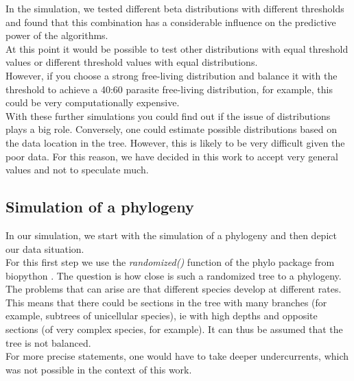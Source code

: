       In the simulation, we tested different beta distributions with different thresholds and found that 
        this combination has a considerable influence on the predictive power of the algorithms. \\
      At this point it would be possible to test other distributions with equal threshold values or 
        different threshold values with equal distributions. \\
      However, if you choose a strong free-living distribution and balance it with the threshold to 
        achieve a 40:60 parasite free-living distribution, for example, this could be very 
        computationally expensive. \\
      
      With these further simulations you could find out if the issue of distributions plays a big role. 
        Conversely, one could estimate possible distributions based on the data location in the tree. 
        However, this is likely to be very difficult given the poor data. For this reason, we have 
        decided in this work to accept very general values and not to speculate much. \\

    \subsection{Simulation of a phylogeny} \label{sec:discussion - simulate phylogeny}
      In our simulation, we start with the simulation of a phylogeny and then depict our data situation. \\
      For this first step we use the \textit{randomized()} function of the phylo package from biopython
        \cite{Cock2009}. The question is how close is such a randomized tree to a phylogeny. \\
      
      The problems that can arise are that different species develop at different rates. This means that 
        there could be sections in the tree with many branches (for example, subtrees of unicellular 
        species), ie with high depths and opposite sections (of very complex species, for example). It 
        can thus be assumed that the tree is not balanced. \\
      For more precise statements, one would have to take deeper undercurrents, which was not possible 
        in the context of this work.

